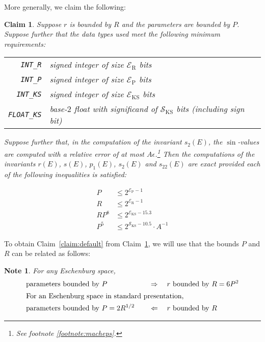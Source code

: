 \documentclass{article}
\newtheorem{note}{Note}
\newtheorem{claim}{Claim}
\newcommand{\macheps}{\epsilon} %
\newcommand{\expP}{\mathcal E_{\text{P}}}
\newcommand{\expR}{\mathcal E_{\text{R}}}
\newcommand{\expKS}{\mathcal E_{\text{KS}}}
\newcommand{\sigKS}{\mathcal S_{\text{KS}}}
\begin{document}
More generally, we claim the following:
\begin{claim}\label{claim:bits}
  Suppose \(r\) is bounded by \(R\) and the parameters are bounded by \(P\).
  Suppose further that the data types used meet the following minimum requirements:
  
  \begin{tabular}{rp{\linewidth-5em}}
    \verb+INT_R+ & signed integer of size \(\expR\) bits \\
    \verb+INT_P+ & signed integer of size \(\expP\) bits \\
    \verb+INT_KS+ & signed integer of size \(\expKS\) bits \\
    \verb+FLOAT_KS+ & base-\(2\) float with significand of \(\sigKS\) bits (including sign bit)
  \end{tabular}
  
  Suppose further that, in the computation of the invariant \(s_{2}(E)\), the \(\sin\)-values are computed with a relative error of at most \(A\macheps\).\footnote{
    See footnote \ref{footnote:macheps}.
  }
  Then the computations of the invariants \(r(E)\), \(s(E)\), \(p_1(E)\), \(s_2(E)\) and \(s_{22}(E)\)
  are exact provided each of the following inequalities is satisfied:
  \begin{multicols}{2}
    \noindent\allowdisplaybreaks
  \begin{align*}
    P & \leq 2^{\expP-1}  \label{eq:bits:PeP}\tag{$a$}          \\
    R    & \leq 2^{\expR-1}  \label{eq:bits:ReR}\tag{$b$}      \\
    RP^8 & \leq 2^{\expKS-15.3} \label{eq:bits:PeKS} \tag{$c$}   \\
    P^5  & \leq 2^{\sigKS-10.5}\label{eq:bits:PsKS}·A^{-1} \tag{$d$}
  \end{align*}
  \end{multicols}
\end{claim}

To obtain Claim~\ref{claim:default} from Claim~\ref{claim:bits}, we will use that the bounds \(P\) and \(R\) can be related as follows:
\begin{note}\label{lem:P-vs-R}
  For any Eschenburg space, 
  \begin{alignat*}{7}
    &\text{parameters bounded by } P &&\quad\Rightarrow\quad r \text{ bounded by } R = 6 P^2\\
    \intertext{%
    For an Eschenburg space in standard presentation,}
    &\text{parameters bounded by } P = 2R^{1/2} &&\quad\Leftarrow\quad r \text{ bounded by } R 
  \end{alignat*}
\end{note}
\end{document}
